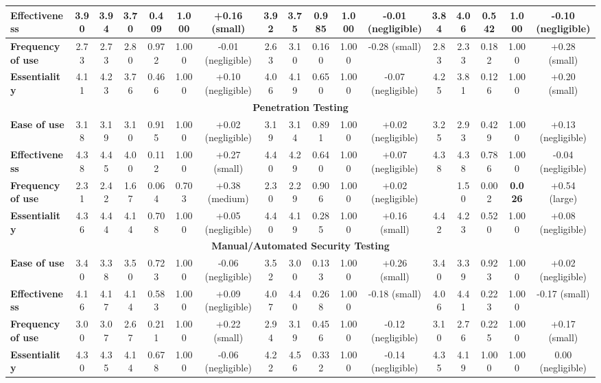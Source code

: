 \begin{tiny}
\begin{longtable}{@{}lcccccccccccccccc@{}}
\textbf{Effectiveness} & 3.90 & 3.94 & 3.70 & 0.409 & 1.000 & \multicolumn{1}{c|}{+0.16 (small)} & 3.92 & 3.75 & 0.985 & 1.000 & \multicolumn{1}{c|}{-0.01 (negligible)} & 3.84 & 4.06 & 0.542 & 1.000 & -0.10 (negligible) \\ \midrule
\textbf{Frequency of use} & 2.73 & 2.73 & 2.80 & 0.972 & 1.000 & \multicolumn{1}{c|}{-0.01 (negligible)} & 2.63 & 3.10 & 0.160 & 1.000 & \multicolumn{1}{c|}{-0.28 (small)} & 2.83 & 2.33 & 0.182 & 1.000 & +0.28 (small) \\ \midrule
\textbf{Essentiality} & 4.11 & 4.23 & 3.76 & 0.466 & 1.000 & \multicolumn{1}{c|}{+0.10 (negligible)} & 4.06 & 4.19 & 0.650 & 1.000 & \multicolumn{1}{c|}{-0.07 (negligible)} & 4.25 & 3.81 & 0.126 & 1.000 & +0.20 (small) \\ \midrule
\multicolumn{17}{c}{\textbf{Penetration Testing}} \\ \midrule
\textbf{Ease of use} & 3.18 & 3.19 & 3.10 & 0.915 & 1.000 & \multicolumn{1}{c|}{+0.02 (negligible)} & 3.19 & 3.14 & 0.891 & 1.000 & \multicolumn{1}{c|}{+0.02 (negligible)} & 3.25 & 2.93 & 0.429 & 1.000 & +0.13 (negligible) \\ \midrule
\textbf{Effectiveness} & 4.38 & 4.45 & 4.00 & 0.112 & 1.000 & \multicolumn{1}{c|}{+0.27 (small)} & 4.40 & 4.29 & 0.640 & 1.000 & \multicolumn{1}{c|}{+0.07 (negligible)} & 4.38 & 4.38 & 0.786 & 1.000 & -0.04 (negligible) \\ \midrule
\textbf{Frequency of use} & 2.31 & 2.42 & 1.67 & 0.064 & 0.703 & \multicolumn{1}{c|}{+0.38 (medium)} & 2.30 & 2.29 & 0.906 & 1.000 & \multicolumn{1}{c|}{+0.02 (negligible)} & \cellcolor[HTML]{D9D9D9}{2.54} & 1.50 & 0.002 & \textbf{0.026} & +0.54 (large) \\ \midrule
\textbf{Essentiality} & 4.36 & 4.44 & 4.14 & 0.708 & 1.000 & \multicolumn{1}{c|}{+0.05 (negligible)} & 4.40 & 4.19 & 0.285 & 1.000 & \multicolumn{1}{c|}{+0.16 (small)} & 4.42 & 4.23 & 0.520 & 1.000 & +0.08 (negligible) \\ \midrule
\multicolumn{17}{c}{\textbf{Manual/Automated Security Testing}} \\ \midrule
\textbf{Ease of use} & 3.40 & 3.38 & 3.50 & 0.723 & 1.000 & \multicolumn{1}{c|}{-0.06 (negligible)} & 3.52 & 3.00 & 0.133 & 1.000 & \multicolumn{1}{c|}{+0.26 (small)} & 3.40 & 3.39 & 0.923 & 1.000 & +0.02 (negligible) \\ \midrule
\textbf{Effectiveness} & 4.16 & 4.17 & 4.14 & 0.583 & 1.000 & \multicolumn{1}{c|}{+0.09 (negligible)} & 4.07 & 4.40 & 0.268 & 1.000 & \multicolumn{1}{c|}{-0.18 (small)} & 4.06 & 4.41 & 0.223 & 1.000 & -0.17 (small) \\ \midrule
\textbf{Frequency of use} & 3.00 & 3.07 & 2.67 & 0.211 & 1.000 & \multicolumn{1}{c|}{+0.22 (small)} & 2.94 & 3.19 & 0.456 & 1.000 & \multicolumn{1}{c|}{-0.12 (negligible)} & 3.10 & 2.76 & 0.225 & 1.000 & +0.17 (small) \\ \midrule
\textbf{Essentiality} & 4.30 & 4.35 & 4.14 & 0.678 & 1.000 & \multicolumn{1}{c|}{-0.06 (negligible)} & 4.22 & 4.56 & 0.332 & 1.000 & \multicolumn{1}{c|}{-0.14 (negligible)} & 4.35 & 4.19 & 1.000 & 1.000 & 0.00 (negligible) \\


\end{longtable}
\end{tiny}
